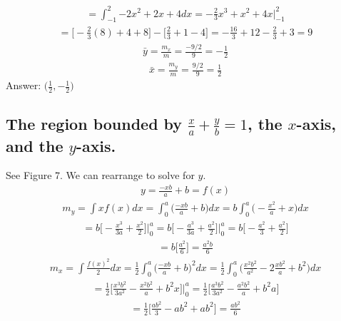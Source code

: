 \documentclass{article}
\begin{document}
\begin{align*}
	= \int_{-1}^2 {-2x^2 + 2x + 4}dx = -\frac{2}{3} x^3 + x^2 + 4x \bigg|_{-1}^2 
\end{align*}
\begin{align*}
	= \bigg[ -\frac{2}{3}(8) + 4 + 8 \bigg] - \bigg[ \frac{2}{3} + 1 - 4 \bigg] = -\frac{16}{3} + 12 - \frac{2}{3} + 3 = 9
\end{align*}
\begin{align*}
	\bar{y} = \frac{m_x}{m} = \frac{-9/2}{9} = -\frac{1}{2}
\end{align*}
\begin{align*}
	\bar{x} = \frac{m_y}{m} = \frac{9/2}{9} = \frac{1}{2}
\end{align*}
Answer: $\bigg( \frac{1}{2}, -\frac{1}{2} \bigg)$

\subsection{The region bounded by $\frac{x}{a} +\frac{y}{b} = 1$, the $x$-axis, and the $y$-axis.}
See Figure 7. We can rearrange to solve for $y$.
\begin{align*}
	y = \frac{-xb}{a} + b = f(x)
\end{align*}
\begin{align*}
	m_y = \int {xf(x)}dx = \int_0^a {\bigg( \frac{-xb}{a} + b \bigg)}dx = b\int_0^a {\bigg( -\frac{x^2}{a} + x \bigg)}dx
\end{align*}
\begin{align*}
	= b \bigg[ -\frac{x^3}{3a} + \frac{x^2}{2} \bigg] \bigg|_0^a = b \bigg[ -\frac{a^3}{3a} + \frac{a^2}{2} \bigg] \bigg|_0^a = b \bigg[ -\frac{a^2}{3} + \frac{a^2}{2} \bigg]
\end{align*}
\begin{align*}
	= b \bigg[ \frac{a^2}{6} \bigg] = \frac{a^2b}{6}
\end{align*}
\begin{align*}
	m_x = \int {\frac{f(x)^2}{2}}dx = \frac{1}{2} \int_0^a {\bigg( \frac{-xb}{a} + b \bigg)^2} dx = \frac{1}{2} \int_0^a {\bigg( \frac{x^2b^2}{a^2} - 2 \frac{xb^2}{a} + b^2 \bigg)}dx
\end{align*}
\begin{align*}
	= \frac{1}{2} \bigg[ \frac{x^3b^2}{3a^2} - \frac{x^2 b^2}{a} + b^2x \bigg] \bigg|_0^a = \frac{1}{2} \bigg[ \frac{a^3b^2}{3a^2} - \frac{a^2b^2}{a} + b^2a \bigg]
\end{align*}
\begin{align*}
	= \frac{1}{2} \bigg[ \frac{ab^2}{3} - ab^2 + ab^2 \bigg] = \frac{ab^2}{6}
\end{align*}
\end{document}
